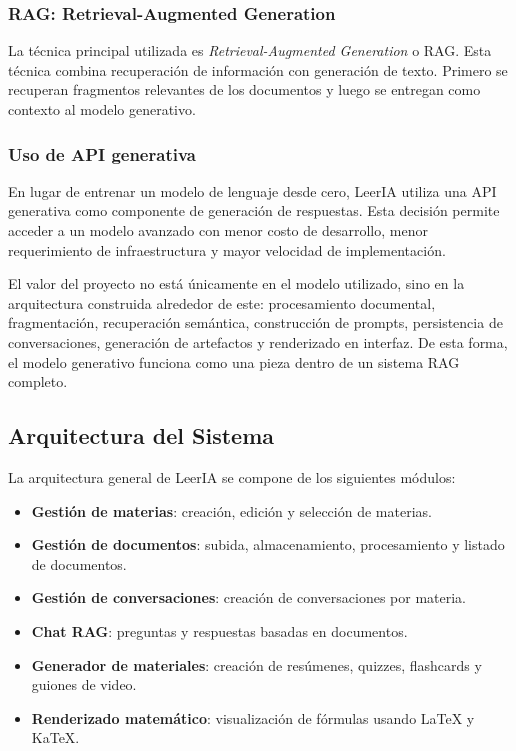 \documentclass[12pt, letterpaper]{article}
\begin{document}
	\subsubsection{RAG: Retrieval-Augmented Generation}
	
	La técnica principal utilizada es \textit{Retrieval-Augmented Generation} o RAG. Esta técnica combina recuperación de información con generación de texto. Primero se recuperan fragmentos relevantes de los documentos y luego se entregan como contexto al modelo generativo.
	
	\subsubsection{Uso de API generativa}
	
	En lugar de entrenar un modelo de lenguaje desde cero, LeerIA utiliza una API generativa como componente de generación de respuestas. Esta decisión permite acceder a un modelo avanzado con menor costo de desarrollo, menor requerimiento de infraestructura y mayor velocidad de implementación.
	
	El valor del proyecto no está únicamente en el modelo utilizado, sino en la arquitectura construida alrededor de este: procesamiento documental, fragmentación, recuperación semántica, construcción de prompts, persistencia de conversaciones, generación de artefactos y renderizado en interfaz. De esta forma, el modelo generativo funciona como una pieza dentro de un sistema RAG completo.
	
	\subsection{Arquitectura del Sistema}
	
	La arquitectura general de LeerIA se compone de los siguientes módulos:
	
	\begin{itemize}
		\item \textbf{Gestión de materias}: creación, edición y selección de materias.
		\item \textbf{Gestión de documentos}: subida, almacenamiento, procesamiento y listado de documentos.
		\item \textbf{Gestión de conversaciones}: creación de conversaciones por materia.
		\item \textbf{Chat RAG}: preguntas y respuestas basadas en documentos.
		\item \textbf{Generador de materiales}: creación de resúmenes, quizzes, flashcards y guiones de video.
		\item \textbf{Renderizado matemático}: visualización de fórmulas usando LaTeX y KaTeX.
	\end{itemize}
	
\end{document}
